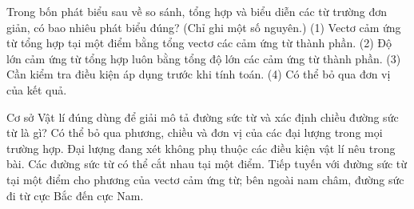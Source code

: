 \begin{ex}
Trong bốn phát biểu sau về so sánh, tổng hợp và biểu diễn các từ trường đơn giản, có bao nhiêu phát biểu đúng? (Chỉ ghi một số nguyên.) (1) Vectơ cảm ứng từ tổng hợp tại một điểm bằng tổng vectơ các cảm ứng từ thành phần. (2) Độ lớn cảm ứng từ tổng hợp luôn bằng tổng độ lớn các cảm ứng từ thành phần. (3) Cần kiểm tra điều kiện áp dụng trước khi tính toán. (4) Có thể bỏ qua đơn vị của kết quả.
\end{ex}

\begin{ex}
Cơ sở Vật lí đúng dùng để giải mô tả đường sức từ và xác định chiều đường sức từ là gì?
\choice
{Có thể bỏ qua phương, chiều và đơn vị của các đại lượng trong mọi trường hợp.}
{Đại lượng đang xét không phụ thuộc các điều kiện vật lí nêu trong bài.}
{Các đường sức từ có thể cắt nhau tại một điểm.}
{\True Tiếp tuyến với đường sức từ tại một điểm cho phương của vectơ cảm ứng từ; bên ngoài nam châm, đường sức đi từ cực Bắc đến cực Nam.}
\end{ex}

